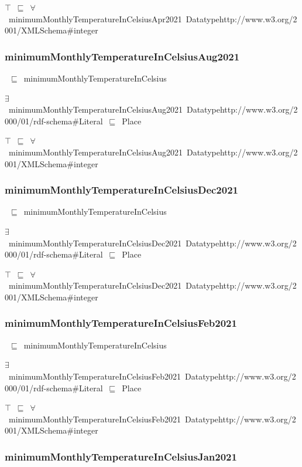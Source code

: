 \documentclass{article}
\begin{document}
\ensuremath{\top}~\ensuremath{\sqsubseteq}~\ensuremath{\forall}~minimumMonthlyTemperatureInCelsiusApr2021~Datatypehttp://www.w3.org/2001/XMLSchema#integer

\subsubsection*{minimumMonthlyTemperatureInCelsiusAug2021}

~\ensuremath{\sqsubseteq}~minimumMonthlyTemperatureInCelsius

\ensuremath{\exists}~minimumMonthlyTemperatureInCelsiusAug2021~Datatypehttp://www.w3.org/2000/01/rdf-schema#Literal~\ensuremath{\sqsubseteq}~Place

\ensuremath{\top}~\ensuremath{\sqsubseteq}~\ensuremath{\forall}~minimumMonthlyTemperatureInCelsiusAug2021~Datatypehttp://www.w3.org/2001/XMLSchema#integer

\subsubsection*{minimumMonthlyTemperatureInCelsiusDec2021}

~\ensuremath{\sqsubseteq}~minimumMonthlyTemperatureInCelsius

\ensuremath{\exists}~minimumMonthlyTemperatureInCelsiusDec2021~Datatypehttp://www.w3.org/2000/01/rdf-schema#Literal~\ensuremath{\sqsubseteq}~Place

\ensuremath{\top}~\ensuremath{\sqsubseteq}~\ensuremath{\forall}~minimumMonthlyTemperatureInCelsiusDec2021~Datatypehttp://www.w3.org/2001/XMLSchema#integer

\subsubsection*{minimumMonthlyTemperatureInCelsiusFeb2021}

~\ensuremath{\sqsubseteq}~minimumMonthlyTemperatureInCelsius

\ensuremath{\exists}~minimumMonthlyTemperatureInCelsiusFeb2021~Datatypehttp://www.w3.org/2000/01/rdf-schema#Literal~\ensuremath{\sqsubseteq}~Place

\ensuremath{\top}~\ensuremath{\sqsubseteq}~\ensuremath{\forall}~minimumMonthlyTemperatureInCelsiusFeb2021~Datatypehttp://www.w3.org/2001/XMLSchema#integer

\subsubsection*{minimumMonthlyTemperatureInCelsiusJan2021}
\end{document}
